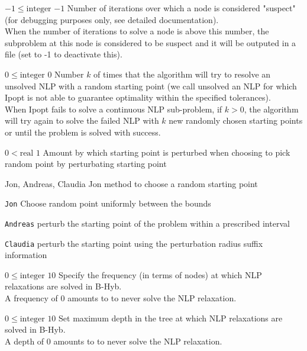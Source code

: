 %
{$-1\leq\textrm{integer}$}%
{$-1$}%
{Number of iterations over which a node is considered "suspect" (for debugging purposes only, see detailed documentation).\\
When the number of iterations to solve a node is above this number, the subproblem at this node is considered to be suspect and it will be outputed in a file (set to -1 to deactivate this).}%
{}

%
{$0\leq\textrm{integer}$}%
{$0$}%
{Number $k$ of times that the algorithm will try to resolve an unsolved NLP with a random starting point (we call unsolved an NLP for which Ipopt is not able to guarantee optimality within the specified tolerances).\\
When Ipopt fails to solve a continuous NLP sub-problem, if $k > 0$, the algorithm will try again to solve the failed NLP with $k$ new randomly chosen starting points  or until the problem is solved with success.}%
{}

%
{$0<\textrm{real}$}%
{$1$}%
{Amount by which starting point is perturbed when choosing to pick random point by perturbating starting point}%
{}

%
{\ttfamily Jon, Andreas, Claudia}%
{Jon}%
{method to choose a random starting point}%
{\begin{list}{}{
\setlength{\parsep}{0em}
\setlength{\leftmargin}{5ex}
\setlength{\labelwidth}{2ex}
\setlength{\itemindent}{0ex}
\setlength{\topsep}{0pt}}
\item[\texttt{Jon}] Choose random point uniformly between the bounds
\item[\texttt{Andreas}] perturb the starting point of the problem within a prescribed interval
\item[\texttt{Claudia}] perturb the starting point using the perturbation radius suffix information
\end{list}
}

%
{$0\leq\textrm{integer}$}%
{$10$}%
{Specify the frequency (in terms of nodes) at which NLP relaxations are solved in B-Hyb.\\
A frequency of 0 amounts to to never solve the NLP relaxation.}%
{}

%
{$0\leq\textrm{integer}$}%
{$10$}%
{Set maximum depth in the tree at which NLP relaxations are solved in B-Hyb.\\
A depth of 0 amounts to to never solve the NLP relaxation.}%
{}

